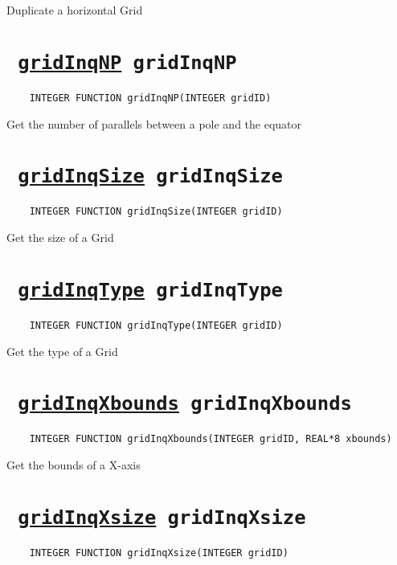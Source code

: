Duplicate a horizontal Grid
\ifpdfoutput{}{(\ref{gridDuplicate})}


\section*{\texttt{ 
\ifpdf
\hyperref[gridInqNP]{gridInqNP}
\else
gridInqNP
\fi
}}
\begin{verbatim}
    INTEGER FUNCTION gridInqNP(INTEGER gridID)
\end{verbatim}

Get the number of parallels between a pole and the equator
\ifpdfoutput{}{(\ref{gridInqNP})}


\section*{\texttt{ 
\ifpdf
\hyperref[gridInqSize]{gridInqSize}
\else
gridInqSize
\fi
}}
\begin{verbatim}
    INTEGER FUNCTION gridInqSize(INTEGER gridID)
\end{verbatim}

Get the size of a Grid
\ifpdfoutput{}{(\ref{gridInqSize})}


\section*{\texttt{ 
\ifpdf
\hyperref[gridInqType]{gridInqType}
\else
gridInqType
\fi
}}
\begin{verbatim}
    INTEGER FUNCTION gridInqType(INTEGER gridID)
\end{verbatim}

Get the type of a Grid
\ifpdfoutput{}{(\ref{gridInqType})}


\section*{\texttt{ 
\ifpdf
\hyperref[gridInqXbounds]{gridInqXbounds}
\else
gridInqXbounds
\fi
}}
\begin{verbatim}
    INTEGER FUNCTION gridInqXbounds(INTEGER gridID, REAL*8 xbounds)
\end{verbatim}

Get the bounds of a X-axis
\ifpdfoutput{}{(\ref{gridInqXbounds})}


\section*{\texttt{ 
\ifpdf
\hyperref[gridInqXsize]{gridInqXsize}
\else
gridInqXsize
\fi
}}
\begin{verbatim}
    INTEGER FUNCTION gridInqXsize(INTEGER gridID)
\end{verbatim}

